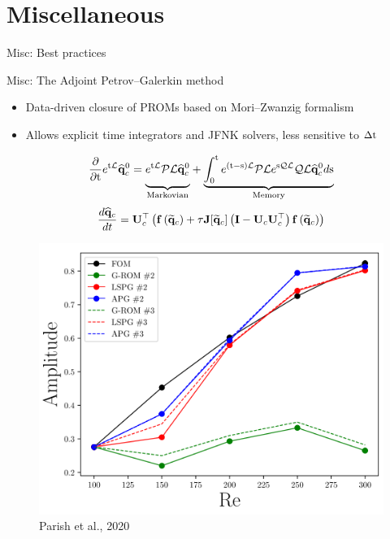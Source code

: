 \documentclass[]{beamer}
\begin{document}
\section*{Miscellaneous}

\begin{frame}{Misc: Best practices}
	
\end{frame}

\begin{frame}{Misc: The Adjoint Petrov--Galerkin method}
	\begin{itemize}
		\item Data-driven closure of PROMs based on Mori--Zwanzig formalism
		\item Allows explicit time integrators and JFNK solvers, less sensitive to $\Delta \text{t}$
	\end{itemize}
	\begin{minipage}{0.49\linewidth}
		\scriptsize
		\begin{equation*}
			\pde{}{\timeVar} e^{\timeVar\MC{L}} \consVecCoef^0 = {\underbrace{\vphantom{ \int_0^{\timeVar} e^{(\timeVar-\text{s}) }} e^{\timeVar\MC{L}} \MC{PL} \consVecCoef^0}_{\text{Markovian}}} + \underbrace{\int_0^{\timeVar} e^{(\timeVar-\text{s}) \MC{L}} \MC{PL} e^{\text{s}\MC{QL}} \MC{QL}\consVecCoef^0 d\text{s}}_{\text{Memory}}
		\end{equation*}
		\begin{equation*}
			\frac{d \consVecCoef}{d t} = \consTrial^\top \left( \rhsFunc{\consVecRom} + \tau \mathbf{J}[\consVecRom] \left(\identMat - \consTrial \consTrial^\top \right) \rhsFunc{\consVecRom} \right)
		\end{equation*}
		\normalsize
	\end{minipage}
	\begin{minipage}{0.49\linewidth}
		\vspace{2em}
		\begin{figure}
			\includegraphics[width=0.8\linewidth]{misc/apg_cylinder.png}
			\caption*{\tiny{Parish et al., 2020}}
		\end{figure}
	\end{minipage}
	
\end{frame}
\end{document}
